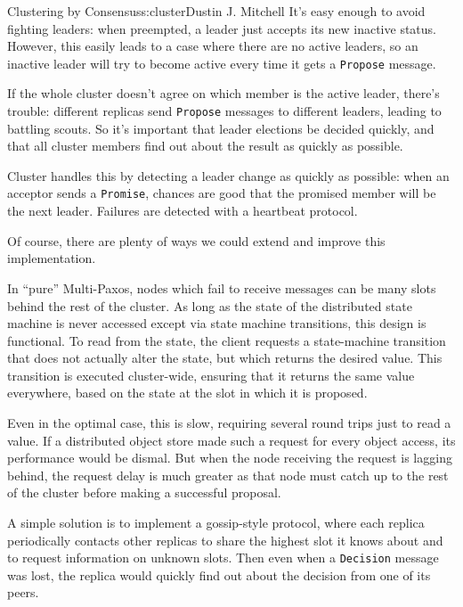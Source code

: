\begin{aosachapter}{Clustering by Consensus}{s:cluster}{Dustin J. Mitchell}
It's easy enough to avoid fighting leaders: when preempted, a leader
just accepts its new inactive status. However, this easily leads to a
case where there are no active leaders, so an inactive leader will try
to become active every time it gets a \texttt{Propose} message.

If the whole cluster doesn't agree on which member is the active leader,
there's trouble: different replicas send \texttt{Propose} messages to
different leaders, leading to battling scouts. So it's important that
leader elections be decided quickly, and that all cluster members find
out about the result as quickly as possible.

Cluster handles this by detecting a leader change as quickly as
possible: when an acceptor sends a \texttt{Promise}, chances are good
that the promised member will be the next leader. Failures are detected
with a heartbeat protocol.

\label{further-extensions}

Of course, there are plenty of ways we could extend and improve this
implementation.

\label{catching-up}

In ``pure'' Multi-Paxos, nodes which fail to receive messages can be
many slots behind the rest of the cluster. As long as the state of the
distributed state machine is never accessed except via state machine
transitions, this design is functional. To read from the state, the
client requests a state-machine transition that does not actually alter
the state, but which returns the desired value. This transition is
executed cluster-wide, ensuring that it returns the same value
everywhere, based on the state at the slot in which it is proposed.

Even in the optimal case, this is slow, requiring several round trips
just to read a value. If a distributed object store made such a request
for every object access, its performance would be dismal. But when the
node receiving the request is lagging behind, the request delay is much
greater as that node must catch up to the rest of the cluster before
making a successful proposal.

A simple solution is to implement a gossip-style protocol, where each
replica periodically contacts other replicas to share the highest slot
it knows about and to request information on unknown slots. Then even
when a \texttt{Decision} message was lost, the replica would quickly
find out about the decision from one of its peers.


\end{aosachapter}
